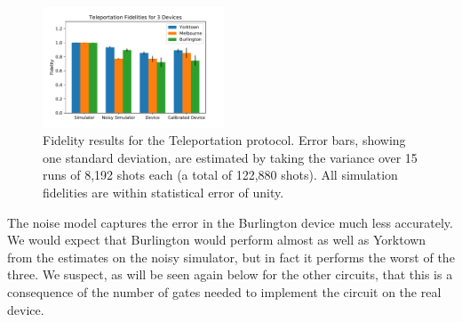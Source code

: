 \begin{figure}[h!] \centering
	\includegraphics[width=0.48\textwidth]{images/results/teleport_histogram.pdf}
	\caption{Fidelity results for the Teleportation protocol. Error bars, showing
one standard deviation, are estimated by taking the variance over 15 runs of
8,192 shots each (a total of 122,880 shots). All simulation fidelities are
within statistical error of unity.}
	\label{fig:teleport_histogram}
\end{figure}
The noise model captures the error in the Burlington device much less
accurately. We would expect that Burlington would perform almost as well as
Yorktown from the estimates on the noisy simulator, but in fact it performs the
worst of the three. We suspect, as will be seen again below for the other
circuits, that this is a consequence of the number of gates needed to implement
the circuit on the real device.
